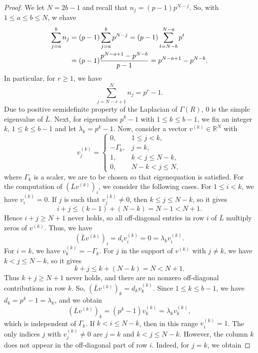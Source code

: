 \documentclass[10pt,a4paper]{amsart}
\begin{document}
\begin{proof}
	We let $N=2b-1$ and recall that $n_j=(p-1)p^{N-j}$. So, with 	$1\le a\le b\le N$, w ehave
	\begin{align}
		\sum_{j=a}^{b} n_j
		&= (p-1)\sum_{j=a}^{b} p^{N-j}
		= (p-1)\sum_{t=N-b}^{N-a} p^t \notag\\
		&= (p-1) \frac{p^{N-a+1}-p^{N-b}}{p-1}
		= p^{N-a+1}-p^{N-b}. \label{eq:general-sum}
	\end{align}
	In particular, for $r\ge1$, we have
	\begin{equation}\label{eq:tail-sum}
		\sum_{j=N-r+1}^{N} n_j = p^r-1.
	\end{equation}
	Due to positive semidefinite property of the Laplacian of $ \varGamma(R)$, $0$ is the simple eigenvalue of $\overline{L}$. Next, for eigenvalues $p^k-1$ with $1\le k\le b-1$, we fix an integer $k$,  $1\le k\le b-1$ and let $
	\lambda_k = p^k-1.$ Now, consider a vector  $v^{(k)}\in\mathbb{R}^N$ with 
	\begin{equation}\label{eq:v-k}
		v^{(k)}_j =
		\begin{cases}
			0, & 1\le j<k,\\
			- \varGamma_k, & j=k,\\
			1, & k<j\le N-k,\\
			0, & N-k<j\le N,
		\end{cases}
	\end{equation}
	where $ \varGamma_k$ is a scaler, we are to be chosen so that eigenequation is satisfied. For the computation of $(\overline{L}v^{(k)})_i$, we consider the following cases. For  $1\le i<k$, we have $v_i^{(k)}=0$. If $j$ is such that $v_j^{(k)}\ne0$, then 
	$k\le j\le N-k$, so it gives
	\[
	i+j\le (k-1)+(N-k) = N-1 < N+1.
	\]
	Hence $i+j\ge N+1$ never holds, so all off-diagonal entries in row $i$ of $\overline{L}$
	multiply zeros of $v^{(k)}$. Thus, we have
	\[
	(\overline{L}v^{(k)})_i = d_i v^{(k)}_i = 0 = \lambda_k v^{(k)}_i.
	\]
	For $i=k$, we have $v^{(k)}_k=- \varGamma_k$. For $j$ in the support of $v^{(k)}$ with
	$j\ne k$, we have $k<j\le N-k$, so it gives
	\[
	k+j \le k+(N-k) = N < N+1.
	\]
	Thus $k+j\ge N+1$ never holds, and there are no nonzero off-diagonal
	contributions in row $k$. So, $(\overline{L}v^{(k)})_k = d_k v^{(k)}_k.$
	Since $1\le k\le b-1$, we have $d_k=p^k-1=\lambda_k$, and we obtain 
	\[
	(\overline{L}v^{(k)})_k = (p^k-1)v^{(k)}_k
	= \lambda_k v^{(k)}_k,
	\]
	which is independent of $ \varGamma_k$. If $k<i\le N-k$, then in this range $v^{(k)}_i=1$. The only indices $j$ with $v_j^{(k)}\ne 0$	are $j=k$ and $k<j\le N-k$. However, the column $k$ does not appear in the off-diagonal part of row $i$. 	Indeed, for $j=k$, we obtain

\end{proof}
\end{document}
